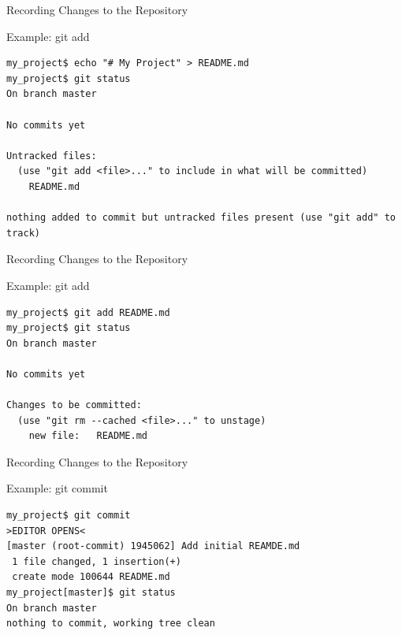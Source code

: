 \documentclass[aspectratio=169]{beamer}
\renewcommand{\footnotesize}{\tiny}
\newcommand{\sectiontitle}{}
\begin{document}
\begin{frame}[fragile]{Recording Changes to the Repository}{\sectiontitle}
\begin{block}{Example: \ttfamily git add}
\begin{verbatim}
my_project$ echo "# My Project" > README.md
my_project$ git status 
On branch master

No commits yet

Untracked files:
  (use "git add <file>..." to include in what will be committed)
    README.md

nothing added to commit but untracked files present (use "git add" to track)
\end{verbatim}
\end{block}
\end{frame}

\begin{frame}[fragile]{Recording Changes to the Repository}{\sectiontitle}
\begin{block}{Example: \ttfamily git add}
\begin{verbatim}
my_project$ git add README.md
my_project$ git status 
On branch master

No commits yet

Changes to be committed:
  (use "git rm --cached <file>..." to unstage)
    new file:   README.md
\end{verbatim}
\end{block}
\end{frame}

\begin{frame}[fragile]{Recording Changes to the Repository}{\sectiontitle}
\begin{block}{Example: \ttfamily git commit}
\begin{verbatim}
my_project$ git commit
>EDITOR OPENS<
[master (root-commit) 1945062] Add initial REAMDE.md
 1 file changed, 1 insertion(+)
 create mode 100644 README.md
my_project[master]$ git status 
On branch master
nothing to commit, working tree clean
\end{verbatim}
\end{block}
\end{frame}
\end{document}
